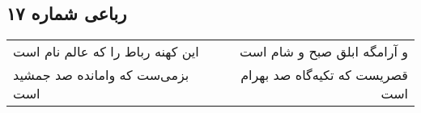 \begin{center}
\section*{رباعی شماره ۱۷}
\label{sec:sh017}
\begin{longtable}{l p{0.5cm} r}
این کهنه رباط را که عالم نام است
&&
و آرامگه ابلق صبح و شام است
\\
بزمی‌ست که وامانده صد جمشید است
&&
قصریست که تکیه‌گاه صد بهرام است
\\
\end{longtable}
\end{center}
